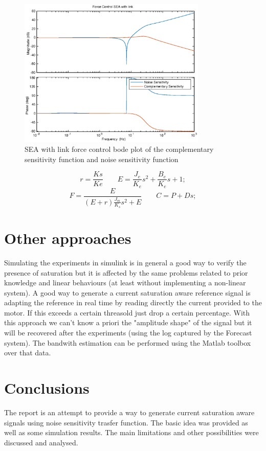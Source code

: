\documentclass[a4paper,11pt]{article}
\begin{document}
\begin{figure}[H]
\begin{center}
\includegraphics[width=0.8\textwidth]{images/sea_tf.eps}
\end{center}
\caption{SEA with link force control bode plot of the complementary sensitivity function and noise sensitivity function}
\label{fig:sea_tf}
\end{figure}

\[
  r = \frac{Ks}{Ke} \qquad
  E = \frac{J_e}{K_e}s^2 + \frac{B_e}{K_e}s + 1;
\]\[
  F = \frac{E}{(E + r)\frac{J_m}{K_s}s^2 + E} \qquad
  C = P + Ds;    
\]

\section{Other approaches}

Simulating the experiments in simulink is in general a good way to verify the presence of saturation but it is affected by the same problems related to prior knowledge and linear behaviours (at least without implementing a non-linear system). A good way to generate a current saturation aware reference signal is adapting the reference in real time by reading directly the current provided to the motor. If this exceeds a certain threasold just drop a certain percentage. With this approach we can't know a priori the "amplitude shape" of the signal but it will be recovered after the experiments (using the log captured by the Forecast system). The bandwith estimation can be performed using the Matlab toolbox over that data.

\section{Conclusions}
The report is an attempt to provide a way to generate current saturation aware signals using noise sensitivity trasfer function. The basic idea was provided as well as some simulation results. The main limitations and other possibilities were discussed and analysed.
\end{document}
